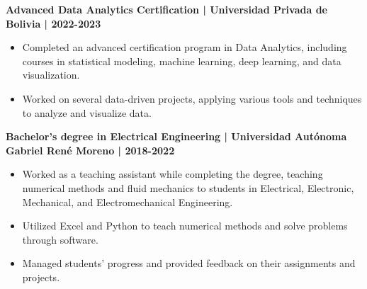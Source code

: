 \documentclass[10pt, letterpaper]{article}
\begin{document}
\textbf{Advanced Data Analytics Certification | Universidad Privada de Bolivia | 2022-2023}

\begin{itemize}[noitemsep]
\item[] Completed an advanced certification program in Data Analytics, including courses in statistical modeling, machine learning, deep learning, and data visualization.
\item[] Worked on several data-driven projects, applying various tools and techniques to analyze and visualize data.
\end{itemize}

\vspace{0.2cm}

\textbf{Bachelor's degree in Electrical Engineering | Universidad Autónoma Gabriel René Moreno | 2018-2022}

\begin{itemize}[noitemsep]
\item[] Worked as a teaching assistant while completing the degree, teaching numerical methods and fluid mechanics to students in Electrical, Electronic, Mechanical, and Electromechanical Engineering.
\item[] Utilized Excel and Python to teach numerical methods and solve problems through software.
\item[] Managed students' progress and provided feedback on their assignments and projects.
\end{itemize}
\end{document}
